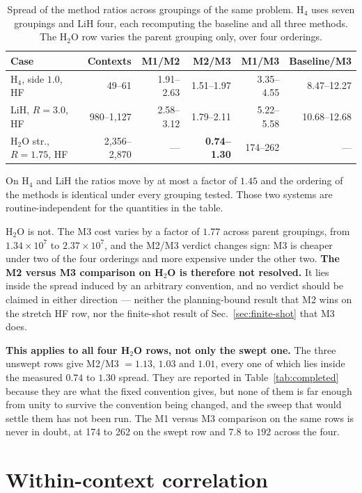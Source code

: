 \documentclass[10pt]{article}
\begin{document}
\begin{table}[!htbp]
\centering
\scriptsize
\caption{Spread of the method ratios across groupings of the same problem. H$_4$ uses seven groupings and LiH four, each recomputing the baseline and all three methods. The H$_2$O row varies the parent grouping only, over four orderings.}
\label{tab:routines}
\begin{tabular}{lrrrrr}
\toprule
Case & Contexts & M1/M2 & M2/M3 & M1/M3 & Baseline/M3 \\
\midrule
H$_4$, side $1.0$, HF & 49--61 & 1.91--2.63 & 1.51--1.97 & 3.35--4.55 & 8.47--12.27 \\
LiH, $R{=}3.0$, HF & 980--1,127 & 2.58--3.12 & 1.79--2.11 & 5.22--5.58 & 10.68--12.68 \\
H$_2$O str., $R{=}1.75$, HF & 2,356--2,870 & --- & \textbf{0.74--1.30} & 174--262 & --- \\
\bottomrule
\end{tabular}
\end{table}

On H$_4$ and LiH the ratios move by at most a factor of $1.45$ and the ordering of
the methods is identical under every grouping tested. Those two systems are
routine-independent for the quantities in the table.

H$_2$O is not. The M3 cost varies by a factor of $1.77$ across parent groupings,
from $1.34\times10^7$ to $2.37\times10^7$, and the M2/M3 verdict changes sign: M3
is cheaper under two of the four orderings and more expensive under the other two.
\textbf{The M2 versus M3 comparison on H$_2$O is therefore not resolved.} It lies
inside the spread induced by an arbitrary convention, and no verdict should be
claimed in either direction --- neither the planning-bound result that M2 wins on
the stretch HF row, nor the finite-shot result of Sec.~\ref{sec:finite-shot} that
M3 does.

\textbf{This applies to all four H$_2$O rows, not only the swept one.} The three
unswept rows give M2/M3 $=1.13$, $1.03$ and $1.01$, every one of which lies inside
the measured $0.74$ to $1.30$ spread. They are reported in
Table~\ref{tab:completed} because they are what the fixed convention gives, but
none of them is far enough from unity to survive the convention being changed, and
the sweep that would settle them has not been run. The M1 versus M3 comparison on
the same rows is never in doubt, at 174 to 262 on the swept row and $7.8$ to $192$
across the four.

\section{Within-context correlation}
\label{sec:correlation}
\end{document}
